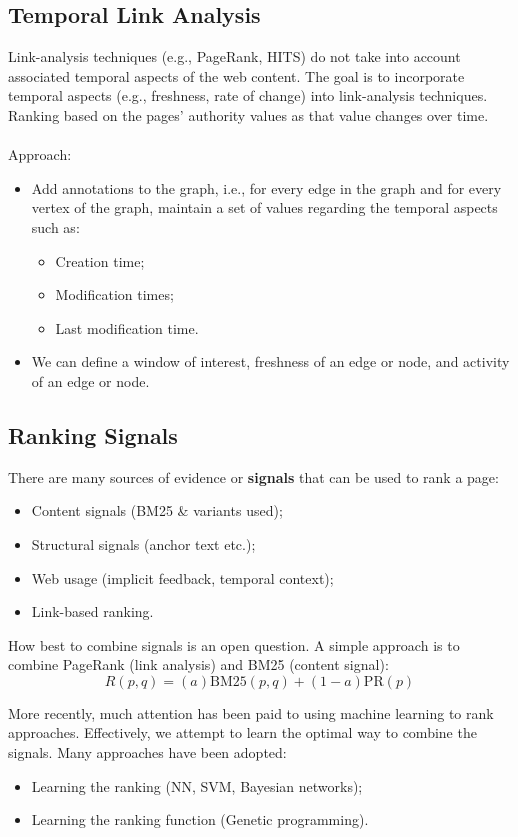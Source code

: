 \documentclass[a4paper,11pt]{article}
\begin{document}
\subsection{Temporal Link Analysis}
Link-analysis techniques (e.g., PageRank, HITS) do not take into account associated temporal aspects of the web content.
The goal is to incorporate temporal aspects (e.g., freshness, rate of change) into link-analysis techniques.
Ranking based on the pages' authority values as that value changes over time.
\\\\
Approach:
\begin{itemize}
    \item   Add annotations to the graph, i.e., for every edge in the graph and for every vertex of the graph, maintain a set of values regarding the temporal aspects such as:
            \begin{itemize}
                \item   Creation time;
                \item   Modification times;
                \item   Last modification time.
            \end{itemize}
    \item   We can define a window of interest, freshness of an edge or node, and activity of an edge or node.
\end{itemize}

\subsection{Ranking Signals}
There are many sources of evidence or \textbf{signals} that can be used to rank a page:
\begin{itemize}
    \item   Content signals (BM25 \& variants used);
    \item   Structural signals (anchor text etc.);
    \item   Web usage (implicit feedback, temporal context);
    \item   Link-based ranking.
\end{itemize}

How best to combine signals is an open question.
A simple approach is to combine PageRank (link analysis) and BM25 (content signal):
\[
    R(p,q) = (a) \text{BM25}(p,q) + (1-a) \text{PR}(p)
\]

More recently, much attention has been paid to using machine learning to rank approaches.
Effectively, we attempt to learn the optimal way to combine the signals.
Many approaches have been adopted:
\begin{itemize}
    \item   Learning the ranking (NN, SVM, Bayesian networks);
    \item   Learning the ranking function (Genetic programming).
\end{itemize}
\end{document}
